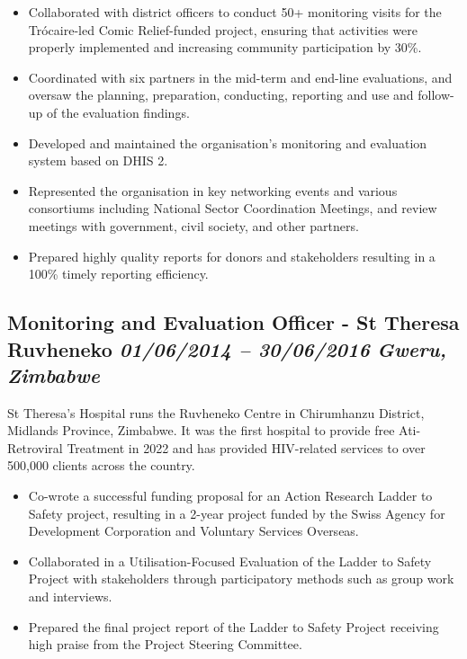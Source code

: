 \documentclass[
  10pt,
]{article}
\providecommand{\tightlist}{%
  \setlength{\itemsep}{0pt}\setlength{\parskip}{0pt}}
\begin{document}
\begin{itemize}
\tightlist
\item
Collaborated with district officers to conduct 50+ monitoring visits for the Trócaire-led Comic Relief-funded project, ensuring that activities were properly implemented and increasing community participation by 30\%.
\item
Coordinated with six partners in the mid-term and end-line evaluations, and oversaw the planning, preparation, conducting, reporting and use and follow-up of the evaluation findings.
\item
Developed and maintained the organisation's monitoring and evaluation system based on DHIS 2.
\item
Represented the organisation in key networking events and various consortiums including National Sector Coordination Meetings, and review meetings with government, civil society, and other partners.
\item
Prepared highly quality reports for donors and stakeholders resulting in a 100\% timely reporting efficiency.
\end{itemize}

\subsection{\texorpdfstring{Monitoring and Evaluation Officer - St Theresa Ruvheneko \emph{01/06/2014 -- 30/06/2016} \textbar{} \emph{Gweru, Zimbabwe}}{Monitoring and Evaluation Officer - St Theresa Ruvheneko 01/06/2014 -- 30/06/2016 \textbar{} Gweru, Zimbabwe}}\label{monitoring-and-evaluation-officer---st-theresa-ruvheneko-01062014-30062016-gweru-zimbabwe}

St Theresa’s Hospital runs the Ruvheneko Centre in Chirumhanzu District, Midlands Province, Zimbabwe. It was the first hospital to provide free Ati-Retroviral Treatment in 2022 and has provided HIV-related services to over 500,000 clients across the country. 

\begin{itemize}
\tightlist
\item
Co-wrote a successful funding proposal for an Action Research Ladder to Safety project, resulting in a 2-year project funded by the Swiss Agency for Development Corporation and Voluntary Services Overseas.
\item
Collaborated in a Utilisation-Focused Evaluation of the Ladder to Safety Project with stakeholders through participatory methods such as group work and interviews.
\item
Prepared the final project report of the Ladder to Safety Project receiving high praise from the Project Steering Committee.
\end{itemize}
\end{document}
